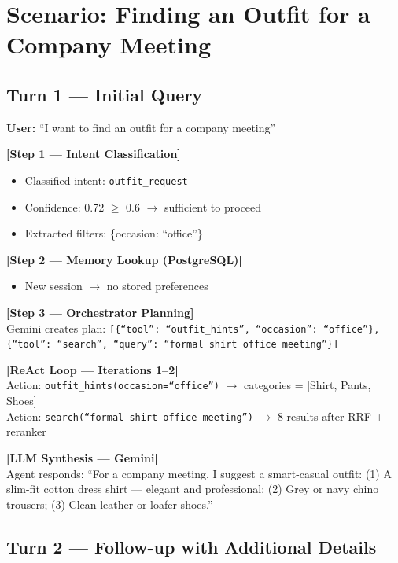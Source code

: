 \documentclass[12pt, twoside]{report}
\begin{document}
\section{Scenario: Finding an Outfit for a Company Meeting}

\subsection{Turn 1 --- Initial Query}

\begin{tcolorbox}[title=Turn 1 Walkthrough]
\textbf{User:} ``I want to find an outfit for a company meeting''

\textbf{[Step 1 --- Intent Classification]}
\begin{itemize}
    \item Classified intent: \texttt{outfit\_request}
    \item Confidence: 0.72 $\geq$ 0.6 $\rightarrow$ sufficient to proceed
    \item Extracted filters: \{occasion: ``office''\}
\end{itemize}

\textbf{[Step 2 --- Memory Lookup (PostgreSQL)]}
\begin{itemize}
    \item New session $\rightarrow$ no stored preferences
\end{itemize}

\textbf{[Step 3 --- Orchestrator Planning]}\\
Gemini creates plan:
\texttt{[\{``tool'': ``outfit\_hints'', ``occasion'': ``office''\}, \{``tool'': ``search'', ``query'': ``formal shirt office meeting''\}]}

\textbf{[ReAct Loop --- Iterations 1--2]}\\
Action: \texttt{outfit\_hints(occasion=``office'')} $\rightarrow$ categories = [Shirt, Pants, Shoes]\\
Action: \texttt{search(``formal shirt office meeting'')} $\rightarrow$ 8 results after RRF + reranker

\textbf{[LLM Synthesis --- Gemini]}\\
Agent responds: ``For a company meeting, I suggest a smart-casual outfit: (1) A slim-fit cotton dress shirt --- elegant and professional; (2) Grey or navy chino trousers; (3) Clean leather or loafer shoes.''
\end{tcolorbox}

\subsection{Turn 2 --- Follow-up with Additional Details}
\end{document}
